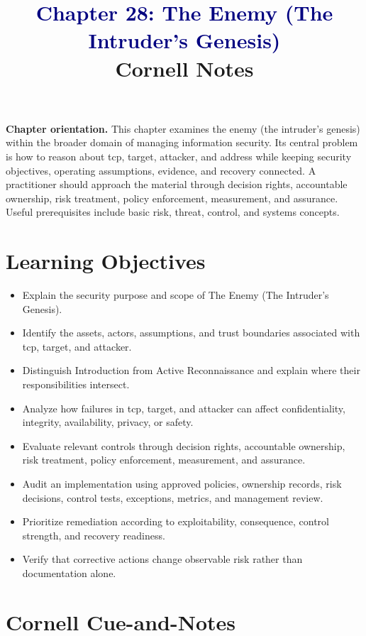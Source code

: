 \documentclass[11pt]{article}
\title{\textcolor{Navy}{Chapter 28: The Enemy (The Intruder's Genesis)}\\[2mm]\large Cornell Notes}
\author{}
\date{}
\begin{document}
\maketitle
\thispagestyle{fancy}
\vspace{-1.5em}
\begin{orientationbox}
\textbf{Chapter orientation.} This chapter examines the enemy (the intruder's genesis) within the broader domain of managing information security. Its central problem is how to reason about tcp, target, attacker, and address while keeping security objectives, operating assumptions, evidence, and recovery connected. A practitioner should approach the material through decision rights, accountable ownership, risk treatment, policy enforcement, measurement, and assurance. Useful prerequisites include basic risk, threat, control, and systems concepts.
\end{orientationbox}
\section*{Learning Objectives}
\begin{itemize}
\item Explain the security purpose and scope of The Enemy (The Intruder's Genesis).
\item Identify the assets, actors, assumptions, and trust boundaries associated with tcp, target, and attacker.
\item Distinguish Introduction from Active Reconnaissance and explain where their responsibilities intersect.
\item Analyze how failures in tcp, target, and attacker can affect confidentiality, integrity, availability, privacy, or safety.
\item Evaluate relevant controls through decision rights, accountable ownership, risk treatment, policy enforcement, measurement, and assurance.
\item Audit an implementation using approved policies, ownership records, risk decisions, control tests, exceptions, metrics, and management review.
\item Prioritize remediation according to exploitability, consequence, control strength, and recovery readiness.
\item Verify that corrective actions change observable risk rather than documentation alone.
\end{itemize}
\section*{Cornell Cue-and-Notes}
\end{document}
